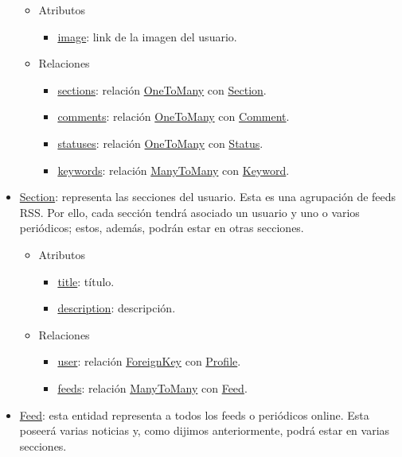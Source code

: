 \begin{itemize}
    \begin{itemize}
        \item Atributos
        \begin{itemize}
            \item \underline{image}: link de la imagen del usuario.
        \end{itemize}
        \item Relaciones
        \begin{itemize}
            \item \underline{sections}: relación \underline{OneToMany} con \underline{Section}.
            \item \underline{comments}: relación \underline{OneToMany} con \underline{Comment}.
            \item \underline{statuses}: relación \underline{OneToMany} con \underline{Status}.
            \item \underline{keywords}: relación \underline{ManyToMany} con \underline{Keyword}.
        \end{itemize}
    \end{itemize}
    \item \underline{Section}: representa las secciones del usuario. Esta es una agrupación de feeds RSS. Por ello, cada sección tendrá asociado un usuario y uno o varios periódicos; estos, además, podrán estar en otras secciones.
    \begin{itemize}
        \item Atributos
        \begin{itemize}
            \item \underline{title}: título.
            \item \underline{description}: descripción.
        \end{itemize}
        \item Relaciones
        \begin{itemize}
            \item \underline{user}: relación \underline{ForeignKey} con \underline{Profile}.
            \item \underline{feeds}: relación \underline{ManyToMany} con \underline{Feed}.
        \end{itemize}
    \end{itemize}
    \item \underline{Feed}: esta entidad representa a todos los feeds o periódicos online. Esta poseerá varias noticias y, como dijimos anteriormente, podrá estar en varias secciones.
    \begin{itemize}

\end{itemize}
\end{itemize}
